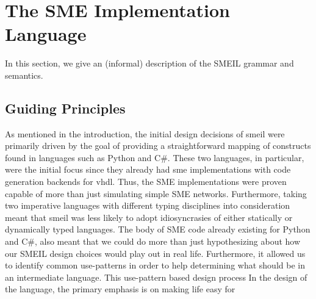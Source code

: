 \chapter{The SME Implementation Language}

In this section, we give an (informal) description of the SMEIL grammar and
semantics. 


\section{Guiding Principles}
As mentioned in the introduction, the initial design decisions of \gls{smeil}
were primarily driven by the goal of providing a straightforward mapping of
constructs found in languages such as Python and C\#. These two languages, in
particular, were the initial focus since they already had \gls{sme}
implementations with code generation backends for \gls{vhdl}. Thus, the SME
implementations were proven capable of more than just simulating simple SME
networks. Furthermore, taking two imperative languages with different typing
disciplines into consideration meant that \gls{smeil} was less likely to
adopt idiosyncrasies of either statically or dynamically typed languages. The
body of SME code already existing for Python and C\#, also meant that we could
do more than just hypothesizing about how our SMEIL design choices would play
out in real life. Furthermore, it allowed us to identify common use-patterns in
order to help determining what should be in an intermediate language. This
use-pattern based design process  In the design of the
language, the primary emphasis is on making life easy for


